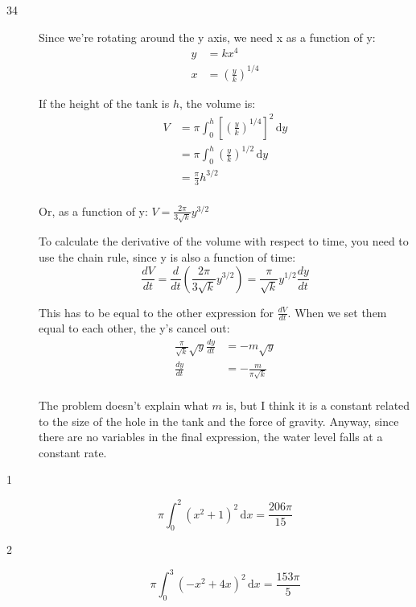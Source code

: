 \documentclass{exam}
\begin{document}
\begin{description}
\item[34]
Since we're rotating around the y axis, we need x as a function of y:
\begin{align*}
  y &= kx^4 \\
  x &= \left( \frac{y}{k} \right)^{1/4}
\end{align*}

If the height of the tank is $h$, the volume is:
\begin{align*}
  V &= \pi \int_0^h \left[ \left( \frac{y}{k} \right)^{1/4} \right]^2 \, \mathrm{d}y \\
  &= \pi \int_0^h \left( \frac{y}{k} \right)^{1/2} \, \mathrm{d}y \\
  &= \frac{\pi}{3} h^{3/2} \\
\end{align*}

Or, as a function of y: $V = \frac{2 \pi}{3 \sqrt{k}} y^{3/2}$

To calculate the derivative of the volume with respect to time, you need to use the chain rule, since y is also a function of time:
\[
  \frac{dV}{dt} = \frac{d}{dt} \left(\frac{2 \pi}{3 \sqrt{k}} y^{3/2} \right) = \frac{\pi}{\sqrt{k}} y^{1/2} \frac{dy}{dt}
\]

This has to be equal to the other expression for $\frac{dV}{dt}$.  When we set them equal to each other, the y's cancel out:
\begin{align*}
  \frac{\pi}{\sqrt{k}} \sqrt{y} \frac{dy}{dt} &= -m \sqrt{y} \\
  \frac{dy}{dt} &= - \frac{m}{\pi \sqrt{k}} \\
\end{align*}

The problem doesn't explain what $m$ is, but I think it is a constant related to the size of the hole in the tank and
the force of gravity.  Anyway, since there are no variables in the final expression, the water level falls at a constant rate.

\pagebreak


\item[1]
\[
  \pi \int_0^2 (x^2 + 1)^2 \, \mathrm{d}x = \frac{206 \pi}{15}
\]

\item[2]
\[
  \pi \int_0^3 (-x^2 + 4x)^2 \, \mathrm{d}x = \frac{153 \pi}{5}
\]


\end{description}
\end{document}
